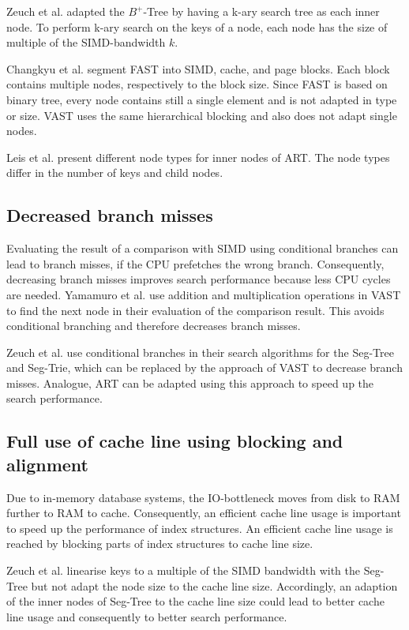 \documentclass[conference]{IEEEtran}
\begin{document}
Zeuch et al. adapted the $B^+$-Tree by having a k-ary search tree as each inner node. To perform k-ary search on the keys of a node, each node has the size of multiple of the SIMD-bandwidth $k$.

Changkyu et al. segment FAST into SIMD, cache, and page blocks. Each block contains multiple nodes, respectively to the block size. Since FAST is based on binary tree, every node contains still a single element and is not adapted in type or size. VAST uses the same hierarchical blocking and also does not adapt single nodes.

Leis et al. present different node types for inner nodes of ART. The node types differ in the number of keys and child nodes. 

\subsection{Decreased branch misses}
Evaluating the result of a comparison with SIMD using conditional branches can lead to branch misses, if the CPU prefetches the wrong branch. Consequently, decreasing branch misses improves search performance because less CPU cycles are needed. Yamamuro et al. use addition and multiplication operations in VAST to find the next node in their evaluation of the comparison result. This avoids conditional branching and therefore decreases branch misses.

Zeuch et al. use conditional branches in their search algorithms for the Seg-Tree and Seg-Trie, which can be replaced by the approach of VAST to decrease branch misses. Analogue, ART can be adapted using this approach to speed up the search performance.
\subsection{Full use of cache line using blocking and alignment}
Due to in-memory database systems, the IO-bottleneck moves from disk to RAM further to RAM to cache. Consequently, an efficient cache line usage is important to speed up the performance of index structures. An efficient cache line usage is reached by blocking parts of index structures to cache line size.

Zeuch et al. linearise keys to a multiple of the SIMD bandwidth with the Seg-Tree but not adapt the node size to the cache line size. Accordingly, an adaption of the inner nodes of Seg-Tree to the cache line size could lead to better cache line usage and consequently to better search performance. 
\end{document}
